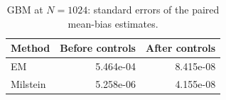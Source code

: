 \begin{table}[H]\centering\small
\caption{GBM at $N=1024$: standard errors of the paired mean-bias estimates.}\label{tab:control-se}
\begin{tabular}{lrr}\toprule
Method & Before controls & After controls\\\midrule
EM & 5.464e-04 & 8.415e-08\\
Milstein & 5.258e-06 & 4.155e-08\\
\bottomrule\end{tabular}
\end{table}
